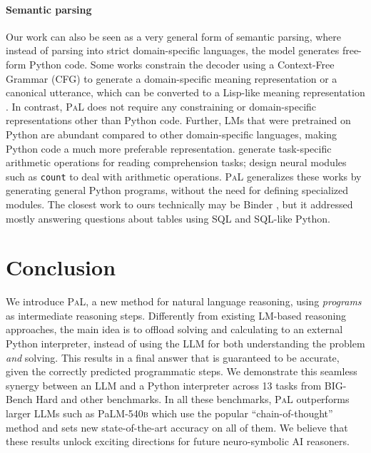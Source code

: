 \documentclass[dvipsnames]{article} \usepackage[accepted]{icml2022}
\newcommand{\ours}{\textsc{PaL}\xspace}
\newcommand{\largepalm}{\textsc{P}a\textsc{LM}\textsc{-540b}\xspace}
\begin{document}
\paragraph{Semantic parsing} 
Our work can also be seen as a very general form of semantic parsing, where instead of parsing into strict domain-specific languages, the model generates free-form Python code.
Some works constrain the decoder using a Context-Free Grammar (CFG) to generate a domain-specific meaning representation \citep{shin2021few} or a canonical utterance, which can be converted to a Lisp-like meaning representation \citep{shin2021constrained}. In contrast, \ours does not require any constraining or domain-specific representations other than Python code. Further, LMs that were pretrained on Python are abundant compared to other domain-specific languages, making Python code a much more preferable representation.
\citet{andor2019giving} generate task-specific arithmetic operations for reading comprehension tasks; 
\citet{gupta2019neural} design neural modules such as \texttt{count} to deal with arithmetic operations. 
\ours generalizes these works by generating general Python programs, without the need for defining specialized modules.
The closest work to ours technically may be Binder \citep{cheng2022binding}, but it addressed mostly answering questions about tables using SQL and SQL-like Python.



 \section{Conclusion}
\label{sec:conclusion}


We introduce \ours, a new method for natural language reasoning, using \emph{programs} as intermediate reasoning steps. 
Differently from existing LM-based reasoning approaches, the main idea is to offload solving and calculating to an external Python interpreter, instead of using the LLM for both understanding the problem \emph{and} solving. This results in a final answer that is guaranteed to be accurate, given the correctly predicted programmatic steps.
We demonstrate this seamless synergy between an LLM and a Python interpreter across 13 tasks from BIG-Bench Hard and other benchmarks. In all these benchmarks, \ours outperforms larger LLMs such as \largepalm which use the popular ``chain-of-thought'' method
and sets new state-of-the-art accuracy on all of them. 
We believe that these results unlock exciting directions for future neuro-symbolic AI reasoners.
\end{document}
